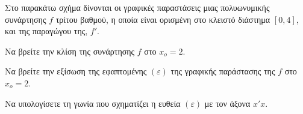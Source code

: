 Στο παρακάτω σχήμα δίνονται οι γραφικές παραστάσεις μιας πολυωνυμικής συνάρτησης $f$ τρίτου βαθμού, η οποία είναι ορισμένη στο κλειστό διάστημα $[0,4]$, και της παραγώγου της, $f'$.
\begin{alist}
    \item Να βρείτε την κλίση της συνάρτησης $f$ στο $x_o = 2$. 
    \item Να βρείτε την εξίσωση της εφαπτομένης $(\varepsilon)$ της γραφικής παράστασης της $f$ στο $x_o = 2$. 
    \item Να υπολογίσετε τη γωνία που σχηματίζει η ευθεία $(\varepsilon)$ με τον άξονα $x'x$. 
\end{alist}